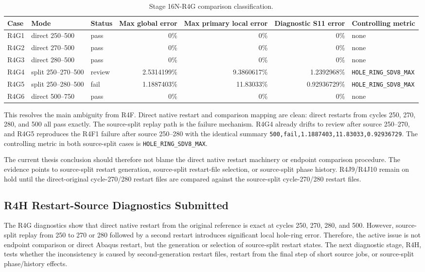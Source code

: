\documentclass[11pt,a4paper]{article}
\newcommand{\code}[1]{\texttt{#1}}
\begin{document}
\begin{table}[H]
\centering
\caption{Stage 16N-R4G comparison classification.}
\begin{tabular}{lllrrrl}
\toprule
Case & Mode & Status & Max global error & Max primary local error & Diagnostic S11 error & Controlling metric \\
\midrule
R4G1 & direct 250--500 & pass & 0\% & 0\% & 0\% & none \\
R4G2 & direct 270--500 & pass & 0\% & 0\% & 0\% & none \\
R4G3 & direct 280--500 & pass & 0\% & 0\% & 0\% & none \\
R4G4 & split 250--270--500 & review & 2.5314199\% & 9.3860617\% & 1.2392968\% & \code{HOLE\_RING\_SDV8\_MAX} \\
R4G5 & split 250--280--500 & fail & 1.1887403\% & 11.83033\% & 0.92936729\% & \code{HOLE\_RING\_SDV8\_MAX} \\
R4G6 & direct 500--750 & pass & 0\% & 0\% & 0\% & none \\
\bottomrule
\end{tabular}
\end{table}

This resolves the main ambiguity from R4F. Direct native restart and comparison mapping are clean: direct restarts from cycles 250, 270, 280, and 500 all pass exactly. The source-split replay path is the failure mechanism. R4G4 already drifts to review after source 250--270, and R4G5 reproduces the R4F1 failure after source 250--280 with the identical summary \code{500,fail,1.1887403,11.83033,0.92936729}. The controlling metric in both source-split cases is \code{HOLE\_RING\_SDV8\_MAX}.

The current thesis conclusion should therefore not blame the direct native restart machinery or endpoint comparison procedure. The evidence points to source-split restart generation, source-split restart-file selection, or source-split phase history. R4J9/R4J10 remain on hold until the direct-original cycle-270/280 restart files are compared against the source-split cycle-270/280 restart files.

\subsection{R4H Restart-Source Diagnostics Submitted}

The R4G diagnostics show that direct native restart from the original reference is exact at cycles 250, 270, 280, and 500. However, source-split replay from 250 to 270 or 280 followed by a second restart introduces significant local hole-ring error. Therefore, the active issue is not endpoint comparison or direct Abaqus restart, but the generation or selection of source-split restart states. The next diagnostic stage, R4H, tests whether the inconsistency is caused by second-generation restart files, restart from the final step of short source jobs, or source-split phase/history effects.
\end{document}
